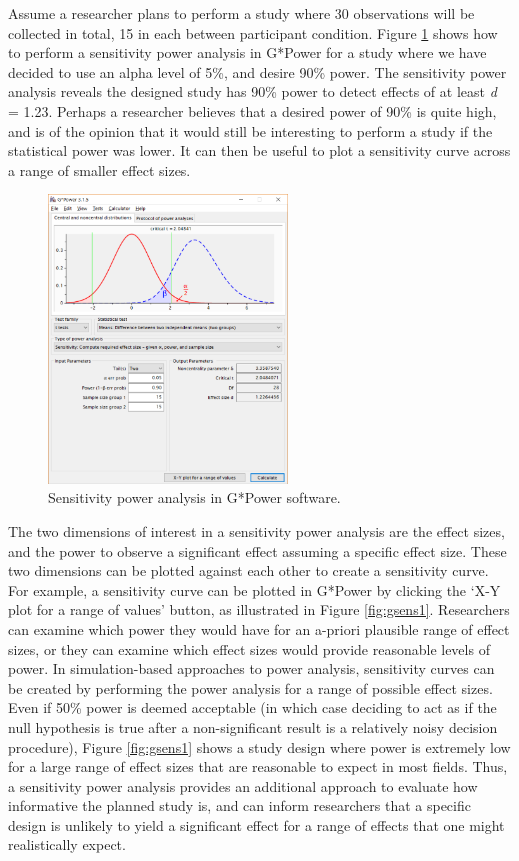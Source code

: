 \documentclass[
  english,
  ,jou,floatsintext]{apa6}
\begin{document}
Assume a researcher plans to perform a study where 30 observations will be collected in total, 15 in each between participant condition. Figure \ref{fig:gsens0} shows how to perform a sensitivity power analysis in G*Power for a study where we have decided to use an alpha level of 5\%, and desire 90\% power. The sensitivity power analysis reveals the designed study has 90\% power to detect effects of at least \emph{d} = 1.23. Perhaps a researcher believes that a desired power of 90\% is quite high, and is of the opinion that it would still be interesting to perform a study if the statistical power was lower. It can then be useful to plot a sensitivity curve across a range of smaller effect sizes.

\begin{figure}
\includegraphics[width=240px]{images/gpow_sensitivity_1} \caption{Sensitivity power analysis in G*Power software.}\label{fig:gsens0}
\end{figure}

The two dimensions of interest in a sensitivity power analysis are the effect sizes, and the power to observe a significant effect assuming a specific effect size. These two dimensions can be plotted against each other to create a sensitivity curve. For example, a sensitivity curve can be plotted in G*Power by clicking the `X-Y plot for a range of values' button, as illustrated in Figure \ref{fig:gsens1}. Researchers can examine which power they would have for an a-priori plausible range of effect sizes, or they can examine which effect sizes would provide reasonable levels of power. In simulation-based approaches to power analysis, sensitivity curves can be created by performing the power analysis for a range of possible effect sizes. Even if 50\% power is deemed acceptable (in which case deciding to act as if the null hypothesis is true after a non-significant result is a relatively noisy decision procedure), Figure \ref{fig:gsens1} shows a study design where power is extremely low for a large range of effect sizes that are reasonable to expect in most fields. Thus, a sensitivity power analysis provides an additional approach to evaluate how informative the planned study is, and can inform researchers that a specific design is unlikely to yield a significant effect for a range of effects that one might realistically expect.
\end{document}
